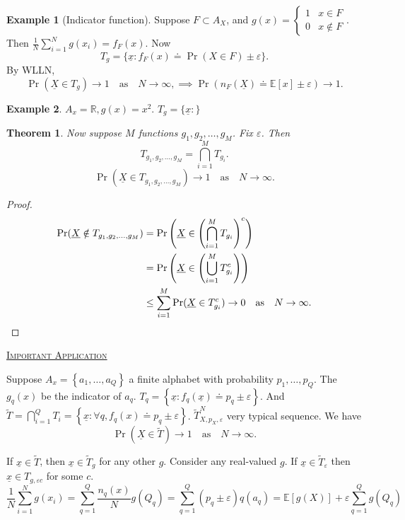 \documentclass{report}
\newcommand{\R}{\mathbb{R}}
\newcommand{\matE}{\mathbb{E}}
\newcommand{\set}[1]{\left\lbrace #1 \right\rbrace}
\newcommand{\fancyem}[1]{\underline{\textsc{#1}}}
\newtheorem{theorem}{Theorem}[section]
\theoremstyle{definition}
\newtheorem{example}{Example}[section]
\theoremstyle{remark}
\numberwithin{equation}{section}
\begin{document}
\begin{example}[Indicator function]
  Suppose $F \subset A_X$, and $g(x) = \begin{cases}
    1 & x \in F \\
    0 & x \notin F
  \end{cases}$. Then $\frac{1}{N}\sum_{i=1}^N g(x_i) = f_F(x)$. Now \[
    T_g = \{\underline{x}: f_F(x) \doteq \Pr(X \in F) \pm \varepsilon\}.
  \] By WLLN,
  \[
    \Pr(\underline{X} \in T_g) \to 1 \quad \text{as} \quad N \to \infty, \implies \Pr(n_F(\underline{X}) \doteq \matE[x] \pm \varepsilon) \to 1.  
  \]
\end{example}
\begin{example}
  $A_x = \R, g(x) = x^2$. $T_g = \{\underline{x}: \}$
\end{example}

\begin{theorem}
Now suppose $M$ functions $g_1, g_2, \ldots, g_M$. Fix $\varepsilon$. Then \[
  T_{g_1, g_2, \ldots, g_M} = \bigcap_{i=1}^M T_{g_i}.
\]
\[
  \Pr(\underline{X} \in T_{g_1, g_2, \ldots, g_M}) \to 1 \quad \text{as} \quad N \to \infty.
\] 
\end{theorem}
\begin{proof}
  \begin{align*}
    \Pr(\underline{X} \notin T_{g_1, g_2, \ldots, g_M}) & = \Pr\left(\underline{X} \in \left( \bigcap_{i=1}^M T_{g_i}\right)^c\right) \\
    & = \Pr\left(\underline{X} \in \left( \bigcup_{i=1}^M T_{g_i}^c\right)\right) \\
    & \leq \sum_{i=1}^M \Pr(\underline{X} \in T_{g_i}^c) \to 0 \quad \text{as} \quad N \to \infty. \qedhere
  \end{align*}
\end{proof}

\fancyem{Important Application}

Suppose $A_x = \set{a_1, \ldots, a_Q}$ a finite alphabet with probability $p_1, \ldots, p_Q$. The $g_q(x)$ be the indicator of $a_q$. $T_q = \set{\underline{x}: f_q(\underline{x})\doteq p_q \pm \varepsilon}$. And $\tilde{T} = \bigcap_{i=1}^Q T_i = \set{\underline{x}: \forall q, f_q(x) \doteq p_q \pm \varepsilon}$. $\tilde{T}_{X, p_X, \varepsilon}^N$ very typical sequence. We have \[
  \Pr(\underline{X} \in \tilde{T}) \to 1 \quad \text{as} \quad N \to \infty. 
\]

If $\underline{x} \in \tilde{T}$, then $\underline{x} \in \tilde{T}_g$ for any other $g$. Consider any real-valued $g$. If $\underline{x} \in \tilde{T}_\varepsilon$ then $\underline{x} \in T_{g, \varepsilon c}$ for some $c$. \[
  \frac{1}{N}\sum_{i=1}^N g(x_i) = \sum_{q=1}^Q \frac{n_q(x)}{N}g(Q_q) = \sum_{q=1}^Q (p_q \pm \varepsilon)q(a_q) = \matE[g(X)] + \varepsilon\sum_{q=1}^Q g(Q_q)  
\]
\end{document}

